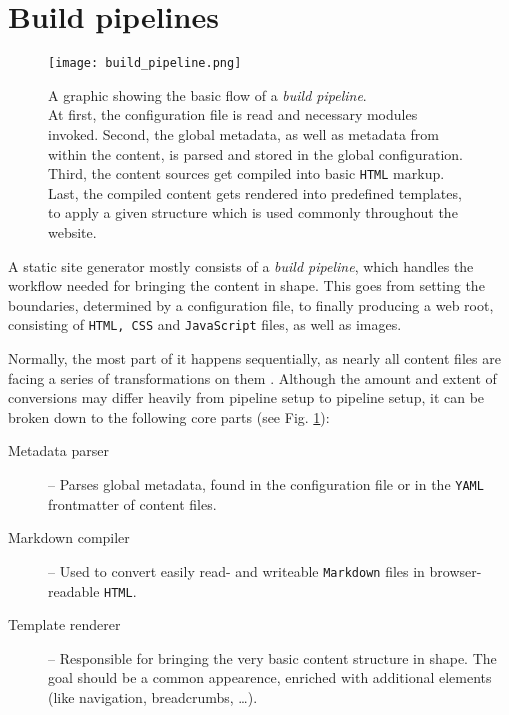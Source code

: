 \section{Build pipelines}
\label{sec:buildpipelines}

\begin{figure} %
    \centering
    \texttt{[image: build\_pipeline.png]}
    \caption{A graphic showing the basic flow of a \emph{build pipeline}.\\
    At first, the configuration file is read and necessary modules invoked. Second, the global metadata, as well as metadata from within the content, is parsed and stored in the global configuration. Third, the content sources get compiled into basic \texttt{HTML} markup. Last, the compiled content gets rendered into predefined templates, to apply a given structure which is used commonly throughout the website.}
    \label{fig:build-pipeline}
\end{figure}
%

A static site generator mostly consists of a \emph{build pipeline}, which handles the workflow needed for bringing the content in shape. This goes from setting the boundaries, determined by a configuration file, to finally producing a web root, consisting of \texttt{HTML, CSS} and \texttt{JavaScript} files, as well as images.

Normally, the most part of it happens sequentially, as nearly all content files are facing a series of transformations on them \cite{Metalsmith2015technicaldocumentation}. Although the amount and extent of conversions may differ heavily from pipeline setup to pipeline setup, it can be broken down to the following core parts (see Fig. \ref{fig:build-pipeline}):

\begin{description}
  \item[Metadata parser] -- Parses global metadata, found in the configuration file or in the \texttt{YAML} frontmatter of content files.
  \item[Markdown compiler] -- Used to convert easily read- and writeable \texttt{Markdown} files in browser-readable \texttt{HTML}.
  \item[Template renderer] -- Responsible for bringing the very basic content structure in shape. The goal should be a common appearence, enriched with additional elements (like navigation, breadcrumbs, \ldots).
\end{description}


